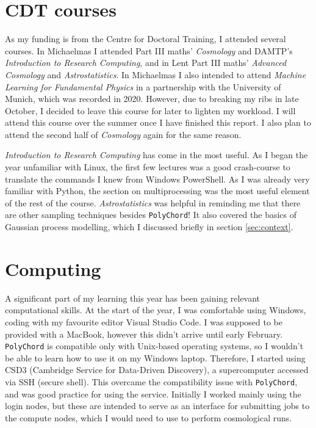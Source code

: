 \documentclass{article}
\begin{document}
\section{CDT courses} 
As my funding is from the Centre for Doctoral Training, I attended several courses. In Michaelmas I attended Part III maths' \textit{Cosmology} and DAMTP's \textit{Introduction to Research Computing}, and in Lent Part III maths' \textit{Advanced Cosmology} and \textit{Astrostatistics}. In Michaelmas I also intended to attend \textit{Machine Learning for Fundamental Physics} in a partnership with the University of Munich, which was recorded in 2020. However, due to breaking my ribs in late October, I decided to leave this course for later to lighten my workload. I will attend this course over the summer once I have finished this report. I also plan to attend the second half of \textit{Cosmology} again for the same reason.

\textit{Introduction to Research Computing} has come in the most useful. As I began the year unfamiliar with Linux, the first few lectures was a good crash-course to translate the commands I knew from Windows PowerShell. As I was already very familiar with Python, the section on multiprocessing was the most useful element of the rest of the course. \textit{Astrostatistics} was helpful in reminding me that there are other sampling techniques besides \texttt{PolyChord}! It also covered the basics of Gaussian process modelling, which I discussed briefly in section \ref{sec:context}.

\newpage

\section{Computing}
A significant part of my learning this year has been gaining relevant computational skills. At the start of the year, I was comfortable using Windows, coding with my favourite editor Visual Studio Code. I was supposed to be provided with a MacBook, however this didn't arrive until early February. \texttt{PolyChord} is compatible only with Unix-based operating systems, so I wouldn't be able to learn how to use it on my Windows laptop. Therefore, I started using CSD3 (Cambridge Service for Data-Driven Discovery), a supercomputer accessed via SSH (secure shell). This overcame the compatibility issue with \texttt{PolyChord}, and was good practice for using the service. Initially I worked mainly using the login nodes, but these are intended to serve as an interface for submitting jobs to the compute nodes, which I would need to use to perform cosmological runs.
\end{document}
